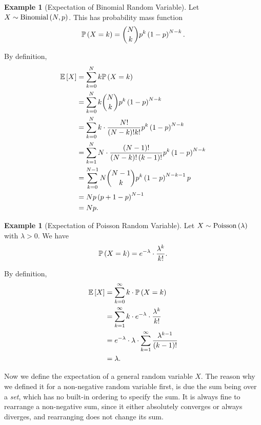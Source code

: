\documentclass{article}
\theoremstyle{definition}
\newtheorem{example}[theorem]{Example}
\theoremstyle{remark}
\newcommand{\Prob}{\mathbb{P}}
\newcommand{\Expt}{\mathbb{E}}
\newcommand{\Binomial}{\operatorname{Binomial}}
\newcommand{\Poisson}{\operatorname{Poisson}}
\begin{document}
\begin{example}[Expectation of Binomial Random Variable]
    \label{ex:expectation-binomial}%
    Let \(X \sim \Binomial\pqty{N, p}\). This has probability mass function
    \[
        \Prob\pqty{X = k} = \binom{N}{k} p^k \pqty{1 - p}^{N - k}.
    \]

    By definition,
    \begin{align*}
        \Expt\bqty{X} &= \sum_{k = 0}^{N} k \Prob\pqty{X = k} \\
        &= \sum_{k = 0}^{N} k \binom{N}{k} p^k \pqty{1 - p}^{N - k} \\
        &= \sum_{k = 0}^{N} k \cdot \frac{N!}{\pqty{N - k}! k!} p^k \pqty{1 - p}^{N - k} \\
        &= \sum_{k = 1}^{N} N \cdot \frac{\pqty{N - 1}!}{\pqty{N - k}! \pqty{k - 1}!} p^k \pqty{1 - p}^{N - k} \\
        &= \sum_{k = 0}^{N - 1} N \binom{N - 1}{k} p^{k} \pqty{1 - p}^{N - k - 1} p \\
        &= Np \pqty{p + 1 - p}^{N - 1} \\
        &= Np.
    \end{align*}
\end{example}

\begin{example}[Expectation of Poisson Random Variable]
    \label{ex:expectation-poisson}%
    Let \(X \sim \Poisson\pqty{\lambda}\) with \(\lambda > 0\). We have
    \[
        \Prob\pqty{X = k} = e^{-\lambda} \cdot \frac{\lambda^k}{k!}.
    \]

    By definition,
    \begin{align*}
        \Expt\bqty{X} &= \sum_{k = 0}^{\infty} k \cdot \Prob\pqty{X = k} \\
        &= \sum_{k = 1}^{\infty} k \cdot e^{-\lambda} \cdot \frac{\lambda^k}{k!} \\
        &= e^{-\lambda} \cdot \lambda \cdot \sum_{k = 1}^{\infty} \frac{\lambda^{k - 1}}{\pqty{k - 1}!} \\
        &=\lambda.
    \end{align*}
\end{example}

Now we define the expectation of a general random variable \(X\). The reason why we defined it for a non-negative random variable first, is due the sum being over a \emph{set}, which has no built-in ordering to specify the sum. It is always fine to rearrange a non-negative sum, since it either absolutely converges or always diverges, and rearranging does not change its sum.
\end{document}
